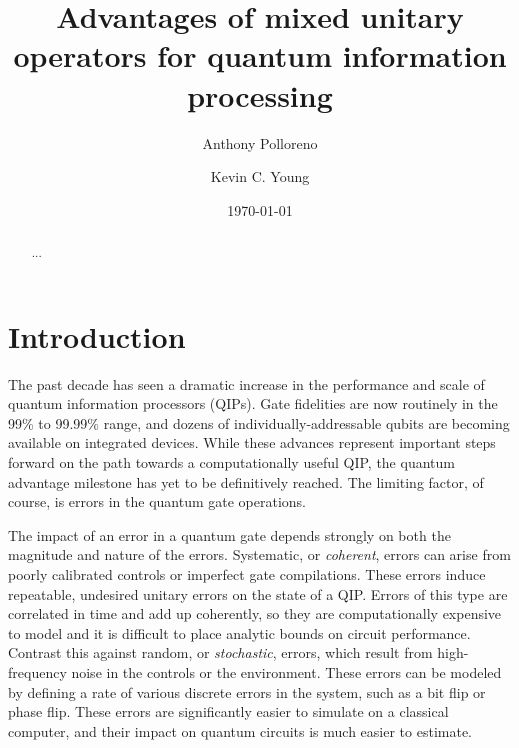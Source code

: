 \documentclass[aps,nofootinbib,pra,notitlepage,twocolumn]{revtex4-1}
\begin{document}
\title{Advantages of mixed unitary operators for quantum information processing}

\author{Anthony Polloreno}

\author{Kevin C. Young}

\date{\today}

\begin{abstract}
...
\end{abstract}

\pacs{}

\maketitle


\section{Introduction}
\label{sec:introduction}

The past decade has seen a dramatic increase in the performance and scale of quantum information processors (QIPs). Gate fidelities are now routinely in the 99\% to 99.99\% range, and dozens of individually-addressable qubits are becoming available on integrated devices. While these advances represent important steps forward on the path towards a computationally useful QIP, the quantum advantage milestone has yet to be definitively reached. The limiting factor, of course, is errors in the quantum gate operations.

The impact of an error in a quantum gate depends strongly on both the magnitude and nature of the errors. Systematic, or \emph{coherent}, errors can arise from poorly calibrated controls or imperfect gate compilations. These errors induce repeatable, undesired unitary errors on the state of a QIP. Errors of this type are correlated in time and add up coherently, so they are computationally expensive to model and it is difficult to place analytic bounds on circuit performance. Contrast this against random, or \emph{stochastic}, errors, which result from high-frequency noise in the controls or the environment. These errors can be modeled by defining a rate of various discrete errors in the system, such as a bit flip or phase flip. These errors are significantly easier to simulate on a classical computer, and their impact on quantum circuits is much easier to estimate.
\end{document}
